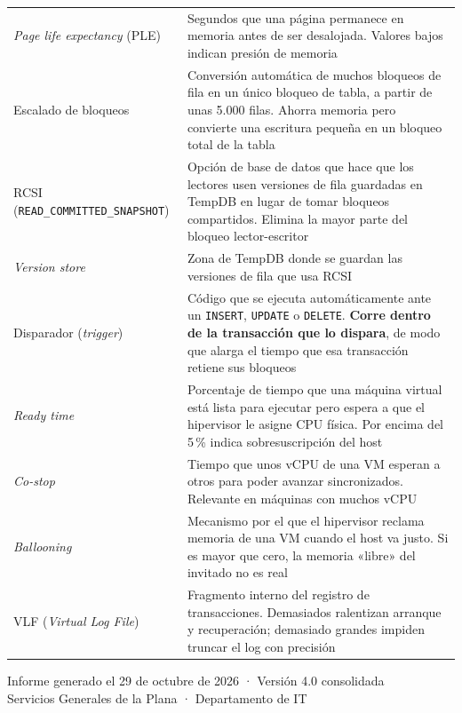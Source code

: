 \documentclass[11pt,a4paper]{article}
\newcommand{\cod}[1]{\texttt{\small #1}}
\begin{document}
\begin{longtable}{p{4.6cm}p{11.2cm}}
\emph{Page life expectancy} (PLE)
  & Segundos que una página permanece en memoria antes de ser desalojada.
    Valores bajos indican presión de memoria \\
Escalado de bloqueos
  & Conversión automática de muchos bloqueos de fila en un único bloqueo de
    tabla, a partir de unas 5.000 filas. Ahorra memoria pero convierte una
    escritura pequeña en un bloqueo total de la tabla \\
RCSI (\cod{READ\_COMMITTED\_SNAPSHOT})
  & Opción de base de datos que hace que los lectores usen versiones de fila
    guardadas en TempDB en lugar de tomar bloqueos compartidos. Elimina la
    mayor parte del bloqueo lector-escritor \\
\emph{Version store}
  & Zona de TempDB donde se guardan las versiones de fila que usa RCSI \\
Disparador (\emph{trigger})
  & Código que se ejecuta automáticamente ante un \cod{INSERT},
    \cod{UPDATE} o \cod{DELETE}. \textbf{Corre dentro de la transacción que
    lo dispara}, de modo que alarga el tiempo que esa transacción retiene sus
    bloqueos \\
\emph{Ready time}
  & Porcentaje de tiempo que una máquina virtual está lista para ejecutar
    pero espera a que el hipervisor le asigne CPU física. Por encima del
    5\,\% indica sobresuscripción del host \\
\emph{Co-stop}
  & Tiempo que unos vCPU de una VM esperan a otros para poder avanzar
    sincronizados. Relevante en máquinas con muchos vCPU \\
\emph{Ballooning}
  & Mecanismo por el que el hipervisor reclama memoria de una VM cuando el
    host va justo. Si es mayor que cero, la memoria «libre» del invitado no
    es real \\
VLF (\emph{Virtual Log File})
  & Fragmento interno del registro de transacciones. Demasiados ralentizan
    arranque y recuperación; demasiado grandes impiden truncar el log con
    precisión \\
\bottomrule
\end{longtable}

\vfill
\begin{center}
\color{gris}\footnotesize
Informe generado el 29 de octubre de 2026 · Versión 4.0 consolidada\\
Servicios Generales de la Plana · Departamento de IT
\end{center}
\end{document}
